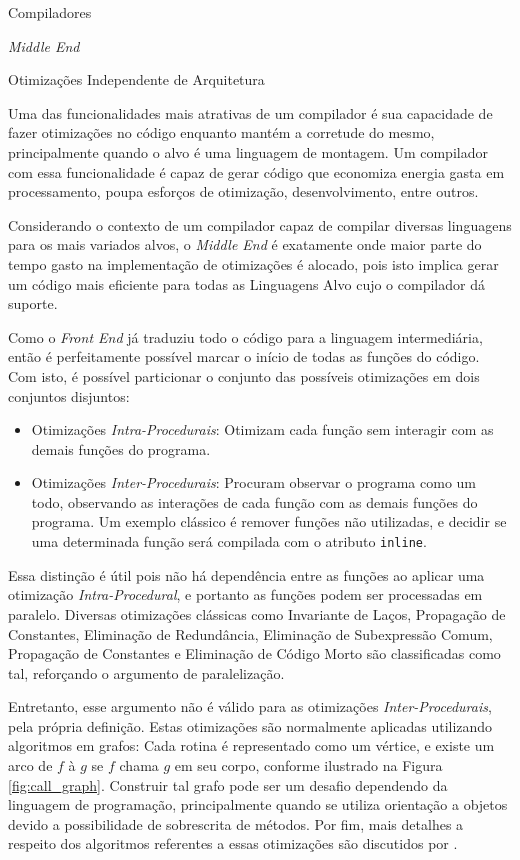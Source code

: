 \begin{section}{Compiladores}
\begin{subsection}{\textit{Middle End}}
\begin{subsubsection}{Otimizações Independente de Arquitetura}

Uma das funcionalidades mais atrativas de um compilador é sua
capacidade de fazer otimizações no código enquanto mantém
a corretude do mesmo, principalmente quando
o alvo é uma linguagem de montagem. Um compilador com essa
funcionalidade é capaz de gerar código que economiza energia
gasta em processamento, poupa esforços de otimização, desenvolvimento,
entre outros.

Considerando o contexto de um compilador capaz de compilar
diversas linguagens para os mais variados alvos, o \textit{Middle End} é
exatamente onde maior parte do tempo gasto na implementação de otimizações é
alocado, pois isto implica gerar um código mais eficiente para todas as
Linguagens Alvo cujo o compilador dá suporte.

Como o \textit{Front End} já traduziu todo o código para a linguagem
intermediária, então é perfeitamente possível marcar o início de
todas as funções do código. Com isto, é possível particionar o
conjunto das possíveis otimizações em dois conjuntos disjuntos:

\begin{itemize}
    \item Otimizações \textit{Intra-Procedurais}: Otimizam cada função sem
interagir com as demais funções do programa.

    \item Otimizações \textit{Inter-Procedurais}: Procuram observar o programa
como um todo, observando as interações de cada função com as demais
funções do programa. Um exemplo clássico é remover funções não utilizadas, e
decidir se uma determinada função será compilada com o atributo \texttt{inline}.
\end{itemize}
Essa distinção é útil pois não há dependência entre as funções
ao aplicar uma otimização \textit{Intra-Procedural}, e portanto as
funções podem ser processadas em paralelo.
Diversas otimizações
clássicas como Invariante de Laços, Propagação de Constantes,
Eliminação de Redundância, Eliminação de Subexpressão Comum,
Propagação de Constantes e Eliminação de Código Morto são
classificadas como tal, reforçando o argumento de paralelização.

Entretanto, esse argumento não é válido para as otimizações \textit{Inter-Procedurais}, pela
própria definição. Estas otimizações são normalmente aplicadas
utilizando algoritmos em grafos:
Cada rotina é representado como um vértice, e existe um arco de $f$
à $g$ se $f$ chama $g$ em seu corpo, conforme ilustrado na Figura
\ref{fig:call_graph}. Construir tal grafo pode ser
um desafio dependendo da linguagem de programação, principalmente
quando se utiliza orientação a objetos devido a possibilidade de
sobrescrita de métodos. Por fim, mais detalhes a respeito dos
algoritmos referentes a essas otimizações são discutidos por
\cite{khedker2009data}.


\end{subsubsection}
\end{subsection}
\end{section}
